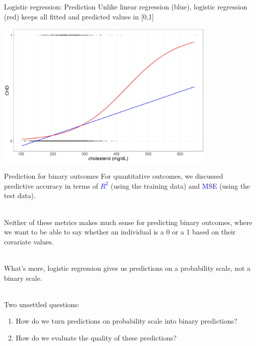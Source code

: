 \documentclass[10pt,t]{beamer}
\begin{document}
\begin{frame}{Logistic regression: Prediction}
	Unlike linear regression (blue), logistic regression (red) keeps all fitted and predicted values in [0,1]
		\begin{center}
		\includegraphics[width=0.8\textwidth]{./figs/scatter_glm}
	\end{center}
\end{frame}

\begin{frame}{Prediction for binary outcomes}
	For quantitative outcomes, we discussed predictive accuracy in terms of \textcolor{blue}{$R^2$} (using the training data) and \textcolor{blue}{MSE} (using the test data). \pause
	\\ ~\
	
	Neither of these metrics makes much sense for predicting binary outcomes, where we want to be able to say whether an individual is a 0 or a 1 based on their covariate values. \pause
	\\ ~\
	
	What's more, logistic regression gives us predictions on a probability scale, not a binary scale. \pause
	\\ ~\
	
	Two unsettled questions: 
	\begin{enumerate}
		\item How do we turn predictions on probability scale into binary predictions? \pause
		\item How do we evaluate the quality of these predictions? 
	\end{enumerate}
\end{frame}
\end{document}
